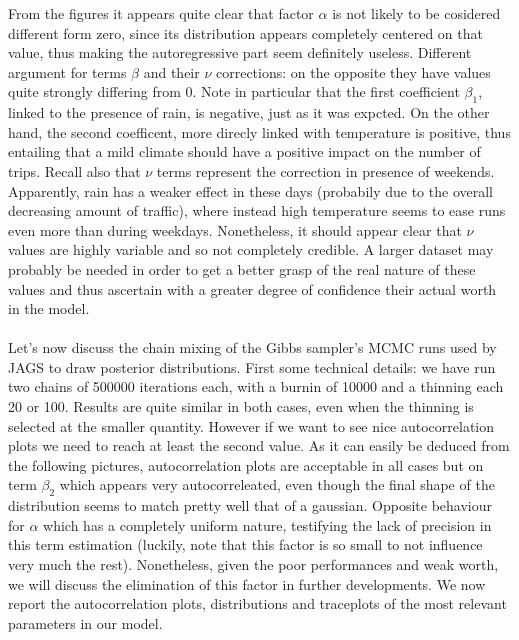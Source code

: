 \documentclass[11pt,twoside]{report}
\begin{document}
From the figures it appears quite clear that factor $ \alpha $ is not likely to be cosidered different form zero, since its distribution appears completely centered on that value, thus making the autoregressive part seem definitely useless. Different argument for terms $ \beta $ and their $ \nu $ corrections: on the opposite they have values quite strongly differing from 0. Note in particular that the first coefficient $ \beta_1 $, linked to the presence of rain, is negative, just as it was expcted. On the other hand, the second coefficent, more direcly linked with temperature is positive, thus entailing that a mild climate should have a positive impact on the number of trips. Recall also that $ \nu $ terms represent the correction in presence of weekends. Apparently, rain has a weaker effect in these days (probabily due to the overall decreasing amount of traffic), where instead high temperature seems to ease runs even more than during weekdays. Nonetheless, it should appear clear that $ \nu $ values are highly variable and so not completely credible. A larger dataset may probably be needed in order to get a better grasp of the real nature of these values and thus ascertain with a greater degree of confidence their actual worth in the model.\\
\\
Let's now discuss the chain mixing of the Gibbs sampler's MCMC runs used by JAGS to draw posterior distributions. First some technical details: we have run two chains of 500000 iterations each, with a burnin of 10000 and a thinning each 20 or 100. Results are quite similar in both cases, even when the thinning is selected at the smaller quantity. However if we want to see nice autocorrelation plots we need to reach at least the second value. As it can easily be deduced from the following pictures, autocorrelation plots are acceptable in all cases but on term $ \beta_2 $ which appears very autocorreleated, even though the final shape of the distribution seems to match pretty well that of a gaussian. Opposite behaviour for $ \alpha $ which has a completely uniform nature, testifying the lack of precision in this term estimation (luckily, note that this factor is so small to not influence very much the rest). Nonetheless, given the poor performances and weak worth, we will discuss the elimination of this factor in further developments. We now report the autocorrelation plots, distributions and traceplots of the most relevant parameters in our model.
\end{document}
